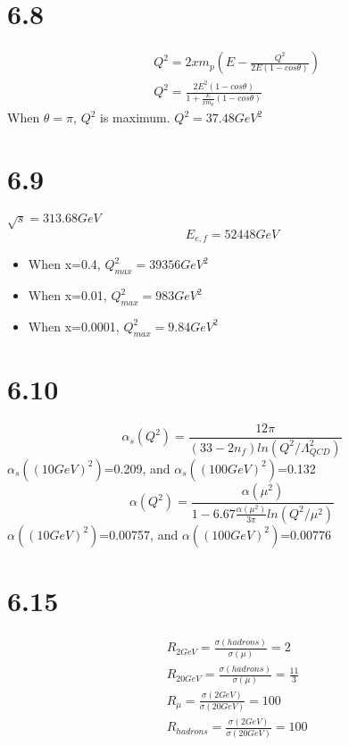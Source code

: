 \documentclass{article}
\begin{document}
\begin{CJK*}{GBK}{song}
\section{6.8}
\begin{equation}
\begin{aligned}
&Q^2=2xm_p(E-\frac{Q^2}{2E(1-cos\theta)})\\
&Q^2=\frac{2E^2(1-cos\theta)}{1+\frac{E}{xm_p}(1-cos\theta)}
\end{aligned}
\end{equation}
When $\theta=\pi$, $Q^2$ is maximum. $Q^2=37.48 GeV^2$


\section{6.9}
$\sqrt{s}=313.68GeV$
\begin{equation}
E_{e,f}=52448GeV
\end{equation}
\begin{itemize}
\item When x=0.4, \quad $Q^2_{max}=39356GeV^2$
\item When x=0.01, \quad $Q^2_{max}=983GeV^2$
\item When x=0.0001, \quad $Q^2_{max}=9.84GeV^2$
\end{itemize}

\section{6.10}
\begin{equation}
\alpha_s(Q^2)=\frac{12\pi}{(33-2n_f)ln(Q^2/\Lambda^2_{QCD})}
\end{equation}
$\alpha_s((10GeV)^2)$=0.209, and $\alpha_s((100GeV)^2)$=0.132
\begin{equation}
\alpha(Q^2)=\frac{\alpha(\mu^2)}{1-6.67\frac{\alpha(\mu^2)}{3\pi}ln(Q^2/\mu^2)}
\end{equation}
$\alpha((10GeV)^2)$=0.00757, and $\alpha((100GeV)^2)$=0.00776

\section{6.15}
\begin{equation}
\begin{aligned}
&R_{2GeV}=\frac{\sigma(hadrons)}{\sigma(\mu)}=2\\
&R_{20GeV}=\frac{\sigma(hadrons)}{\sigma(\mu)}=\frac{11}{3}\\
&R_{\mu}=\frac{\sigma(2GeV)}{\sigma(20GeV)}=100\\
&R_{hadrons}=\frac{\sigma(2GeV)}{\sigma(20GeV)}=100\\
\end{aligned}
\end{equation}


\end{CJK*}
\end{document}
